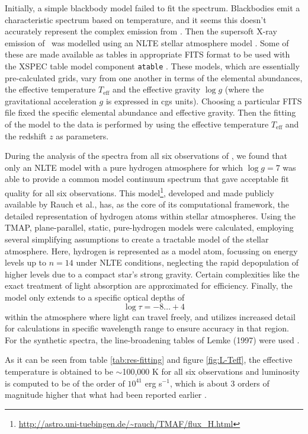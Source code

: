     Initially, a simple blackbody model failed to fit the spectrum. Blackbodies emit a characteristic spectrum based on temperature, and it seems this doesn't accurately represent the complex emission from \source. Then the supersoft X-ray emission of \source\ was modelled using an NLTE stellar atmosphere model \cite{werner1999classical}. Some of these are made available as tables in appropriate FITS format to be used with the XSPEC table model component \texttt{atable} \cite{rauch2003grid,rauch2010nlte}. These models, which are essentially pre-calculated grids, vary from one another in terms of the elemental abundances, the effective temperature $T_\text{eff}$ and the effective gravity $\log{g}$ (where the gravitational acceleration $g$ is expressed in cgs units). Choosing a particular FITS file fixed the specific elemental abundance and effective gravity. Then the fitting of the model to the data is performed by using the effective temperature $T_\text{eff}$ and the redshift $z$ as parameters.
    
    During the analysis of the spectra from all six observations of \source, we found that only an NLTE model with a pure hydrogen atmosphere for which $\log{g}=7$ was able to provide a common model continuum spectrum that gave acceptable fit quality for all six observations. This model\footnote{\url{http://astro.uni-tuebingen.de/~rauch/TMAF/flux_H.html}}, developed and made publicly available by Rauch et al., has, as the core of its computational framework, the detailed representation of hydrogen atoms within stellar atmospheres. Using the TMAP,  plane-parallel, static, pure-hydrogen models were calculated, employing several simplifying assumptions to create a tractable model of the stellar atmosphere. Here, hydrogen is represented as a model atom, focussing on energy levels up to $n=14$ under NLTE conditions, neglecting the rapid depopulation of higher levels due to a compact star's strong gravity. Certain complexities like the exact treatment of light absorption are approximated for efficiency. Finally, the model only extends to a specific optical depths of
    $$\log{\tau}=-8\dots+4$$
    within the atmosphere where light can travel freely, and utilizes increased detail for calculations in specific wavelength range to ensure accuracy in that region. For the synthetic spectra, the line-broadening tables of Lemke (1997) were used \cite{lemke1997extended}.
    
    As it can be seen from table \ref{tab:res-fitting} and figure \ref{fig:L-Teff}, the effective temperature is obtained to be $\sim$100,000 K for all six observations and luminosity is computed to be of the order of $10^{41}$ erg s$^{-1}$, which is about 3 orders of magnitude higher that what had been reported earlier \cite{hartmann1999constraining}.
    
